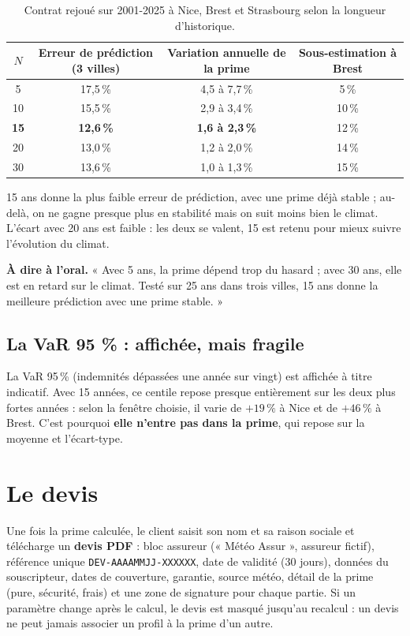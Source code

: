 \documentclass[11pt,a4paper]{article}
\begin{document}
\begin{table}[H]
\centering\small
\begin{tabular}{cccc}
\toprule
$N$ & Erreur de prédiction (3 villes) & Variation annuelle de la prime & Sous-estimation à Brest\\
\midrule
5 & 17,5\,\% & 4,5 à 7,7\,\% & 5\,\%\\
10 & 15,5\,\% & 2,9 à 3,4\,\% & 10\,\%\\
\textbf{15} & \textbf{12,6\,\%} & \textbf{1,6 à 2,3\,\%} & 12\,\%\\
20 & 13,0\,\% & 1,2 à 2,0\,\% & 14\,\%\\
30 & 13,6\,\% & 1,0 à 1,3\,\% & 15\,\%\\
\bottomrule
\end{tabular}
\caption{Contrat rejoué sur 2001-2025 à Nice, Brest et Strasbourg selon la longueur d'historique.}
\end{table}

15 ans donne la plus faible erreur de prédiction, avec une prime déjà stable ; au-delà, on ne gagne presque plus en
stabilité mais on suit moins bien le climat. L'écart avec 20 ans est faible : les deux se valent, 15 est retenu pour
mieux suivre l'évolution du climat.

\begin{encadre}
\textbf{À dire à l'oral.} « Avec 5 ans, la prime dépend trop du hasard ; avec 30 ans, elle est en retard sur le climat.
Testé sur 25 ans dans trois villes, 15 ans donne la meilleure prédiction avec une prime stable. »
\end{encadre}

\subsection{La VaR 95 \% : affichée, mais fragile}
La VaR 95\,\% (indemnités dépassées une année sur vingt) est affichée à titre indicatif. Avec 15 années, ce centile
repose presque entièrement sur les deux plus fortes années : selon la fenêtre choisie, il varie de $+19\,\%$ à Nice et de
$+46\,\%$ à Brest. C'est pourquoi \textbf{elle n'entre pas dans la prime}, qui repose sur la moyenne et l'écart-type.

\section{Le devis}
Une fois la prime calculée, le client saisit son nom et sa raison sociale et télécharge un \textbf{devis PDF} :
bloc assureur (« Météo Assur », assureur fictif), référence unique \texttt{DEV-AAAAMMJJ-XXXXXX}, date de validité (30 jours),
données du souscripteur, dates de couverture, garantie, source météo, détail de la prime (pure, sécurité, frais) et une
zone de signature pour chaque partie. Si un paramètre change après le calcul, le devis est masqué jusqu'au recalcul :
un devis ne peut jamais associer un profil à la prime d'un autre.
\end{document}
